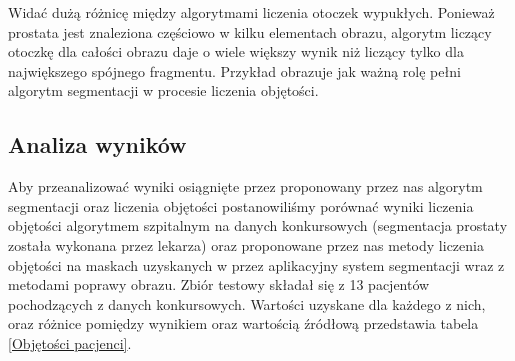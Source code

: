 \documentclass[a4paper,11pt,twoside]{report}
\theoremstyle{definition}
\begin{document}
Widać dużą różnicę między algorytmami liczenia otoczek wypukłych. Ponieważ prostata jest znaleziona częściowo w kilku elementach obrazu, algorytm liczący otoczkę dla całości obrazu daje o wiele większy wynik niż liczący tylko dla największego spójnego fragmentu. Przykład obrazuje jak ważną rolę pełni algorytm segmentacji w procesie liczenia objętości.

\subsection{Analiza wyników}
Aby przeanalizować wyniki osiągnięte przez proponowany przez nas algorytm segmentacji oraz liczenia objętości postanowiliśmy porównać wyniki liczenia objętości algorytmem szpitalnym na danych konkursowych (segmentacja prostaty została wykonana przez lekarza) oraz proponowane przez nas metody liczenia objętości na maskach uzyskanych w przez aplikacyjny system segmentacji wraz z metodami poprawy obrazu. Zbiór testowy składał się z 13 pacjentów pochodzących z danych konkursowych. Wartości uzyskane dla każdego z nich, oraz różnice pomiędzy wynikiem oraz wartością źródłową przedstawia tabela \ref{Objętości pacjenci}.
\end{document}
